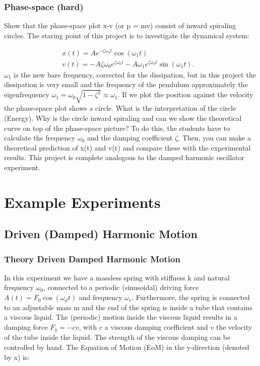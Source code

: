 \documentclass{article}
\begin{document}
\subsubsection{Phase-space (hard)}    
Show that the phase-space plot x-v (or p = mv) consist of inward spiraling circles. The staring point of this project is to investigate the dynamical system:

\begin{align}
    x(t) = Ae^{-\zeta\omega_0t}\cos(\omega_1 t) & \\
    v(t) = -A \zeta \omega_0 e^{\zeta \omega_0 t} - A \omega_1e^{\zeta \omega_0 t}\sin(\omega_1 t).
\end{align}
$\omega_1$ is the new bare frequency, corrected for the dissipation, but in this project the dissipation is very small and the frequency of the pendulum approximately the eigenfrequency $\omega_1 =\omega_0\sqrt{1-\zeta^2}\approx \omega_1$. 
If we plot the position against the velocity the phase-space plot shows a circle. What is the interpretation of the circle (Energy). Why is the circle inward spiraling and can we show the theoretical curve on top of the phase-space picture? To do this, the students have to calculate the frequency $\omega_0$ and the damping coefficient $\zeta$. Then, you can make a theoretical prediction of x(t) and v(t) and compare these with the experimental results. This project is complete analogous to the damped harmonic oscillator experiment.

\newpage


\section{Example Experiments}

\subsection{Driven (Damped) Harmonic Motion}
\subsubsection{Theory Driven Damped Harmonic Motion}
In this experiment we have a massless spring with stiffness k and natural frequency $\omega_0$, connected to a periodic (sinusoidal) driving force $A(t) = F_0\cos(\omega_d t)$ and frequency $\omega_r$. Furthermore, the spring is connected to an adjustable mass m and the end of the spring is inside a tube that contains a viscous liquid. The (periodic) motion inside the viscous liquid results in a damping force $F_y = -cv$, with c a viscous damping coefficient and $v$ the velocity of the tube inside the liquid. The strength of the viscous damping can be controlled by hand. The Equation of Motion (EoM) in the y-direction (denoted by x) is:
\end{document}
